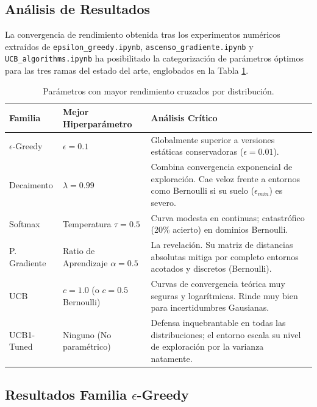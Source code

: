 \subsection{Análisis de Resultados}\label{analisis-de-resultados}

La convergencia de rendimiento obtenida tras los experimentos numéricos
extraídos de \texttt{epsilon\_greedy.ipynb},
\texttt{ascenso\_gradiente.ipynb} y \texttt{UCB\_algorithms.ipynb} ha
posibilitado la categorización de parámetros óptimos para las tres ramas
del estado del arte, englobados en la Tabla \ref{tab:Resultados}.

\begin{table}[t]
\centering
\caption{Parámetros con mayor rendimiento cruzados por distribución.}
\label{tab:Resultados}
\begin{tabular}{|l|l|p{7cm}|}
\hline
\textbf{Familia} & \textbf{Mejor Hiperparámetro} & \textbf{Análisis Crítico} \\ \hline
$\epsilon$-Greedy   & $\epsilon = 0.1$                                  & Globalmente superior a versiones estáticas conservadoras ($\epsilon=0.01$). \\ \hline
Decaimento      & $\lambda = 0.99$                                  & Combina convergencia exponencial de exploración. Cae veloz frente a entornos como Bernoulli si su suelo ($\epsilon_{min}$) es severo.\\ \hline
Softmax         & Temperatura $\tau = 0.5$                 & Curva modesta en continuas; catastrófico (20\% acierto) en dominios Bernoulli. \\ \hline
P. Gradiente    & Ratio de Aprendizaje $\alpha = 0.5$      & La revelación. Su matriz de distancias absolutas mitiga por completo entornos acotados y discretos (Bernoulli).  \\ \hline
UCB             & $c = 1.0$ (o $c=0.5$ Bernoulli)                    & Curvas de convergencia teórica muy seguras y logarítmicas. Rinde muy bien para incertidumbres Gausianas. \\ \hline
UCB1-Tuned      & Ninguno (No paramétrico)                          & Defensa inquebrantable en todas las distribuciones; el entorno escala su nivel de exploración por la varianza natamente. \\ \hline
\end{tabular}
\end{table}

\subsection{\texorpdfstring{Resultados Familia
\(\epsilon\)-Greedy}{Resultados Familia \textbackslash epsilon-Greedy}}\label{resultados-familia-epsilon-greedy}

